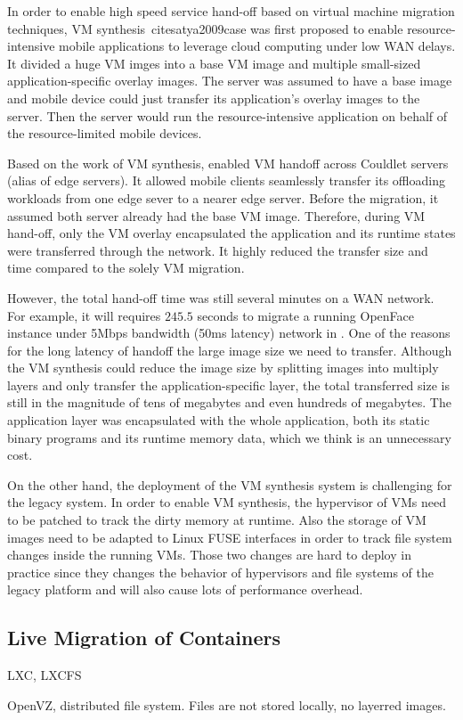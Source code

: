 In order to enable high speed service hand-off based on virtual machine migration techniques, VM synthesis\ cite{satya2009case}  was first proposed to enable resource-intensive mobile applications to leverage cloud computing under low WAN delays. It divided a huge VM imges into a base VM image and multiple small-sized application-specific overlay images. The server was assumed to have a base image and mobile device could just transfer its application's overlay images to the server. Then the server would run the resource-intensive application on behalf of the resource-limited mobile devices. 


Based on the work of VM synthesis, \cite{ha2015vmhandoff} enabled VM handoff across Couldlet servers (alias of edge servers). It allowed mobile clients seamlessly transfer its offloading workloads from one edge sever to a nearer edge server. Before the migration, it assumed both server already had the base VM image. Therefore, during VM hand-off, only the VM overlay encapsulated the application and its runtime states were transferred through the network. It highly reduced the transfer size and time compared to the solely VM migration. 

However,
the total hand-off time was still several minutes on a WAN network. For example, it will requires $245.5$ seconds to migrate a running OpenFace instance under 5Mbps bandwidth (50ms latency) network in \cite{ha2015vmhandoff}. 
One of the reasons for the long latency of handoff the large image size we need to transfer. Although the VM synthesis could reduce the image size by splitting images into multiply layers and only transfer the application-specific layer, the total transferred size is still in the magnitude of tens of megabytes and even hundreds of megabytes. 
The application layer was encapsulated with the whole application, both its static binary programs and its runtime memory data, which we think is an unnecessary cost. 

On the other hand, the deployment of the VM synthesis system is challenging for the legacy system. In order to enable VM synthesis, the hypervisor of VMs need to be patched to track the dirty memory at runtime. Also the storage of VM images need to be adapted to Linux FUSE interfaces in order to track file system changes inside the running VMs. Those two changes are hard to deploy in practice since they changes the behavior of hypervisors and file systems of the legacy platform and will also cause lots of performance overhead. 


\subsection{Live Migration of Containers}
LXC, 
LXCFS


OpenVZ, distributed file system\cite{openvzfs}. Files are not stored locally, no layerred images.
